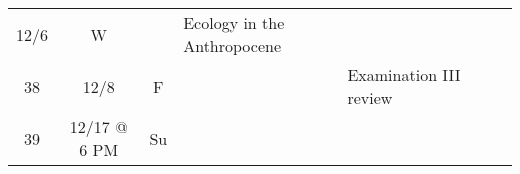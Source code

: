 \documentclass[]{article}
\begin{document}
\begin{longtable}[]{@{}cccllll@{}}
\begin{minipage}[t]{0.08\columnwidth}
12/6\strut
\end{minipage} & \begin{minipage}[t]{0.07\columnwidth}\centering\strut
W\strut
\end{minipage} & \begin{minipage}[t]{0.10\columnwidth}\raggedright\strut
\strut
\end{minipage} & \begin{minipage}[t]{0.11\columnwidth}\raggedright\strut
Ecology in the Anthropocene\strut
\end{minipage} & \begin{minipage}[t]{0.11\columnwidth}\raggedright\strut
\strut
\end{minipage} & \begin{minipage}[t]{0.16\columnwidth}\raggedright\strut
\strut
\end{minipage}\tabularnewline
\begin{minipage}[t]{0.12\columnwidth}\centering\strut
38\strut
\end{minipage} & \begin{minipage}[t]{0.08\columnwidth}\centering\strut
12/8\strut
\end{minipage} & \begin{minipage}[t]{0.07\columnwidth}\centering\strut
F\strut
\end{minipage} & \begin{minipage}[t]{0.10\columnwidth}\raggedright\strut
\strut
\end{minipage} & \begin{minipage}[t]{0.11\columnwidth}\raggedright\strut
Examination III review\strut
\end{minipage} & \begin{minipage}[t]{0.11\columnwidth}\raggedright\strut
\strut
\end{minipage} & \begin{minipage}[t]{0.16\columnwidth}\raggedright\strut
\strut
\end{minipage}\tabularnewline
\begin{minipage}[t]{0.12\columnwidth}\centering\strut
39\strut
\end{minipage} & \begin{minipage}[t]{0.08\columnwidth}\centering\strut
12/17 @ 6 PM\strut
\end{minipage} & \begin{minipage}[t]{0.07\columnwidth}\centering\strut
Su\strut
\end{minipage} & \begin{minipage}[t]{0.10\columnwidth}\raggedright\strut

\end{minipage}
\end{longtable}
\end{document}
